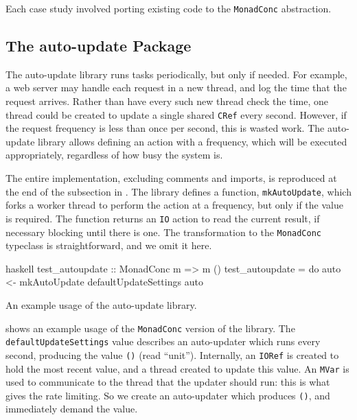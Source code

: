 Each case study involved porting existing code to the \verb|MonadConc|
abstraction.

\subsection{The auto-update Package}

The auto-update library\cite{auto_update} runs tasks periodically, but
only if needed.  For example, a web server may handle each request in
a new thread, and log the time that the request arrives.  Rather than
have every such new thread check the time, one thread could be created
to update a single shared \verb|CRef| every second.  However, if the
request frequency is less than once per second, this is wasted work.
The auto-update library allows defining an action with a frequency,
which will be executed appropriately, regardless of how busy the
system is.

The entire implementation, excluding comments and imports, is
reproduced at the end of the subsection in .  The
library defines a function, \verb|mkAutoUpdate|, which forks a worker
thread to perform the action at a frequency, but only if the value is
required.  The function returns an \verb|IO| action to read the
current result, if necessary blocking until there is one.  The
transformation to the \verb|MonadConc| typeclass is straightforward,
and we omit it here.

\begin{listing}
\centering
\begin{cminted}{haskell}
test_autoupdate :: MonadConc m => m ()
test_autoupdate = do
  auto <- mkAutoUpdate defaultUpdateSettings
  auto
\end{cminted}
\caption{An example usage of the auto-update library.}\label{lst:autoupdate_example1}
\end{listing}

 shows an example usage of the
\verb|MonadConc| version of the library.  The
\verb|defaultUpdateSettings| value describes an auto-updater which
runs every second, producing the value \verb|()| (read ``unit'').
Internally, an \verb|IORef| is created to hold the most recent value,
and a thread created to update this value.  An \verb|MVar| is used to
communicate to the thread that the updater should run: this is what
gives the rate limiting.  So we create an auto-updater which produces
\verb|()|, and immediately demand the value.

